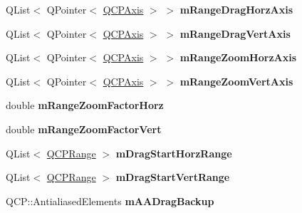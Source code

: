 \begin{DoxyCompactItemize}
\item 
Q\+List$<$ Q\+Pointer$<$ \hyperlink{classQCPAxis}{Q\+C\+P\+Axis} $>$ $>$ {\bfseries m\+Range\+Drag\+Horz\+Axis}\hypertarget{classQCPAxisRect_abd4f1d854b41a9c6730f3a3d605c42af}{}\label{classQCPAxisRect_abd4f1d854b41a9c6730f3a3d605c42af}

\item 
Q\+List$<$ Q\+Pointer$<$ \hyperlink{classQCPAxis}{Q\+C\+P\+Axis} $>$ $>$ {\bfseries m\+Range\+Drag\+Vert\+Axis}\hypertarget{classQCPAxisRect_a3b0a86e5bb136a458d7bc20773e45853}{}\label{classQCPAxisRect_a3b0a86e5bb136a458d7bc20773e45853}

\item 
Q\+List$<$ Q\+Pointer$<$ \hyperlink{classQCPAxis}{Q\+C\+P\+Axis} $>$ $>$ {\bfseries m\+Range\+Zoom\+Horz\+Axis}\hypertarget{classQCPAxisRect_aa35eeb02f68b63f2069fcc80c9334b91}{}\label{classQCPAxisRect_aa35eeb02f68b63f2069fcc80c9334b91}

\item 
Q\+List$<$ Q\+Pointer$<$ \hyperlink{classQCPAxis}{Q\+C\+P\+Axis} $>$ $>$ {\bfseries m\+Range\+Zoom\+Vert\+Axis}\hypertarget{classQCPAxisRect_aafb0e243294c158668499fd62cee057c}{}\label{classQCPAxisRect_aafb0e243294c158668499fd62cee057c}

\item 
double {\bfseries m\+Range\+Zoom\+Factor\+Horz}\hypertarget{classQCPAxisRect_ad08d0250ed7b99de387d0ea6c7fd4dc1}{}\label{classQCPAxisRect_ad08d0250ed7b99de387d0ea6c7fd4dc1}

\item 
double {\bfseries m\+Range\+Zoom\+Factor\+Vert}\hypertarget{classQCPAxisRect_a32f063629581d5bf82b12769940b34ad}{}\label{classQCPAxisRect_a32f063629581d5bf82b12769940b34ad}

\item 
Q\+List$<$ \hyperlink{classQCPRange}{Q\+C\+P\+Range} $>$ {\bfseries m\+Drag\+Start\+Horz\+Range}\hypertarget{classQCPAxisRect_a274aef08c4de084a3f26c3e92fac3a79}{}\label{classQCPAxisRect_a274aef08c4de084a3f26c3e92fac3a79}

\item 
Q\+List$<$ \hyperlink{classQCPRange}{Q\+C\+P\+Range} $>$ {\bfseries m\+Drag\+Start\+Vert\+Range}\hypertarget{classQCPAxisRect_ab362ee8f71a156d812a1ea793a1e42cb}{}\label{classQCPAxisRect_ab362ee8f71a156d812a1ea793a1e42cb}

\item 
Q\+C\+P\+::\+Antialiased\+Elements {\bfseries m\+A\+A\+Drag\+Backup}\hypertarget{classQCPAxisRect_aa4a24f76360cfebe1bcf17a77fa7521b}{}\label{classQCPAxisRect_aa4a24f76360cfebe1bcf17a77fa7521b}


\end{DoxyCompactItemize}
